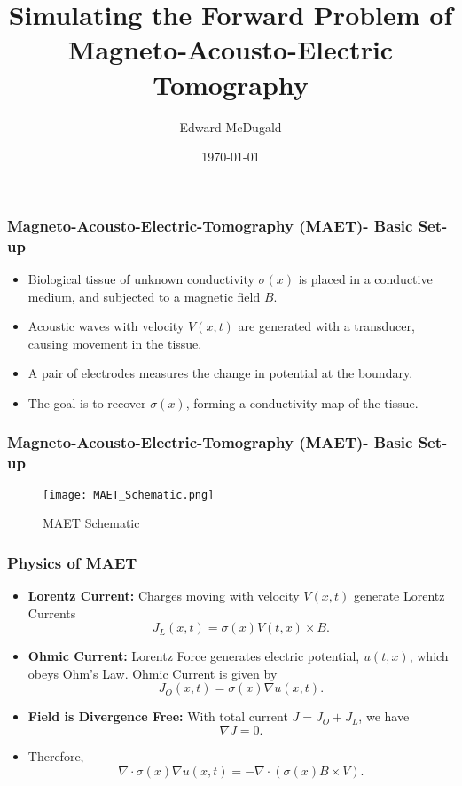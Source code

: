 \documentclass[]{beamer}
\title{Simulating the Forward Problem of Magneto-Acousto-Electric Tomography}
\author{Edward McDugald}
\institute{University of Arizona}
\date{\today}
\begin{document}
\begin{frame}
  \titlepage
\end{frame}

\begin{frame}
    \frametitle{Magneto-Acousto-Electric-Tomography (MAET)- Basic Set-up}
  \begin{itemize}
      \item Biological tissue of unknown conductivity $\sigma(x)$ is placed in a conductive medium, and subjected to a magnetic field $B$.
      \item Acoustic waves with velocity $V(x,t)$ are generated with a transducer, causing movement in the tissue.
    \item A pair of electrodes measures the change in potential at the boundary.
    \item The goal is to recover $\sigma(x)$, forming a conductivity map of the tissue.
  \end{itemize}
   \end{frame}

\begin{frame}
    \frametitle{Magneto-Acousto-Electric-Tomography (MAET)- Basic Set-up}
     \centering
            \begin{figure}
            \texttt{[image: MAET\_Schematic.png]}
            \caption{MAET Schematic}
            \end{figure}

\end{frame}


\begin{frame}
  \frametitle{Physics of MAET}
  \begin{itemize}
      \item \textbf{Lorentz Current:} Charges moving with velocity $V(x,t)$ generate Lorentz Currents
          \[
              J_L(x,t) = \sigma(x)V(t,x)\times B.
          \]
    \item \textbf{Ohmic Current:} Lorentz Force generates electric potential, $u(t,x)$, which obeys Ohm's Law. Ohmic Current is given by
        \[
            J_O(x,t) = \sigma(x)\nabla u(x,t).
        \]
    \item \textbf{Field is Divergence Free:} With total current $J = J_O + J_L$, we have
        \[
        \nabla J = 0.
        \]
    \item Therefore,
        \[
            \nabla \cdot \sigma(x)\nabla u(x,t) = -\nabla \cdot \left(\sigma(x)B \times V\right).
        \]
     \end{itemize}
 \end{frame}
\end{document}
